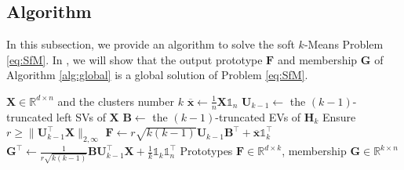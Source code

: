 \documentclass[journal]{IEEEtran}
\begin{document}
\subsection{Algorithm}
In this subsection, we provide an algorithm to solve the soft $k$-Means Problem \eqref{eq:SfM}.
In , we will show that the output prototype $\mathbf{F}$ and membership $\mathbf{G}$ of Algorithm \ref{alg:global} is a global solution of Problem \eqref{eq:SfM}.
\begin{algorithm}[H]  
	\caption{Solve the Soft $k$-Means Problem \eqref{eq:SfM}}  
	\label{alg:global}
	\begin{algorithmic}[1]  
		\Require $\mathbf{X}\in\mathbb{R}^{d\times n}$ and the clusters number $k$
		\State $\overline{\mathbf{x}} \leftarrow \frac{1}{n}\mathbf{X}\mathbb{1}_n$
		\State $\mathbf{U}_{k-1}\leftarrow$  the $(k-1)$-truncated left SVs of $\mathbf{X}$
		\State $\mathbf{B} \leftarrow$ the $(k-1)$-truncated EVs of $\mathbf{H}_k$
		\State Ensure $r \geq \|\mathbf{U}_{k-1}^\top\mathbf{X} \|_{2,\infty}$
		\State $\mathbf{F}\leftarrow r\sqrt{k(k-1)}\mathbf{U}_{k-1}\mathbf{B}^\top + \overline{\mathbf{x}}\mathbb{1}_k^\top$
		\State $\mathbf{G}^\top \leftarrow \frac{1}{r\sqrt{k(k-1)}}\mathbf{BU}_{k-1}^\top \mathbf{X} + \frac{1}{k}\mathbb{1}_k\mathbb{1}_n^\top$
		\Ensure Prototypes $\mathbf{F} \in \mathbb{R}^{d\times k}$, membership $\mathbf{G} \in \mathbb{R}^{k \times n}$
		
		\label{code:recentEnd}  
	\end{algorithmic}  
\end{algorithm} 
%
\newtheorem{remark}{\bf Remark}
\end{document}
